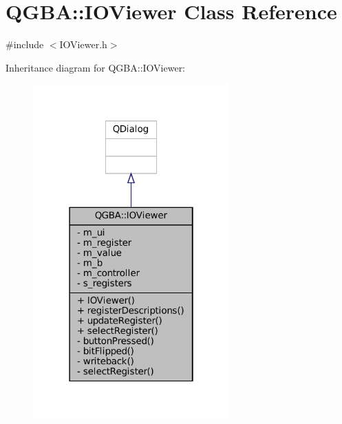 \hypertarget{class_q_g_b_a_1_1_i_o_viewer}{}\section{Q\+G\+BA\+:\+:I\+O\+Viewer Class Reference}
\label{class_q_g_b_a_1_1_i_o_viewer}


{\ttfamily \#include $<$I\+O\+Viewer.\+h$>$}



Inheritance diagram for Q\+G\+BA\+:\+:I\+O\+Viewer\+:
\nopagebreak
\begin{figure}[H]
\begin{center}
\leavevmode
\includegraphics[width=214pt]{class_q_g_b_a_1_1_i_o_viewer__inherit__graph}
\end{center}
\end{figure}


